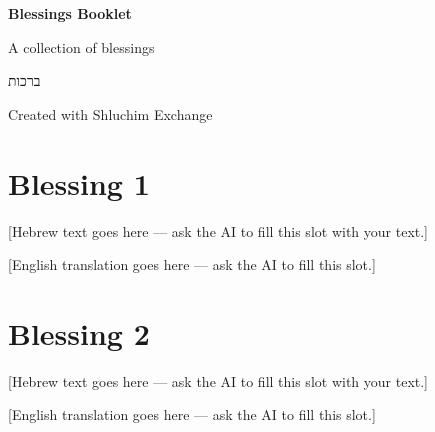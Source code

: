 \documentclass[11pt, openany]{book}
\newenvironment{hebrew}{%
  \par\begingroup\hebrewfont\TeXXeTstate=1\beginR\parindent=0pt\relax
}{%
  \endR\endgroup\par
}
\newcommand{\blessingslot}[3]{%
  \section*{#1}
  \begin{hebrew}#2\end{hebrew}
  \vspace{0.4em}
  {\color{muted}#3}
  \vspace{1.2em}
}
\begin{document}
\thispagestyle{empty}
\begin{center}
\vspace*{2.5cm}

{\color{accent}\Huge\bfseries Blessings Booklet}

\vspace{0.8cm}

{\large A collection of blessings}

\vspace{2cm}

{\hebrewfonttitle\color{accent} ברכות}

\vfill

{\small Created with Shluchim Exchange}
\end{center}
\clearpage

\blessingslot{Blessing 1}{%
[Hebrew text goes here — ask the AI to fill this slot with your text.]
}{%
[English translation goes here — ask the AI to fill this slot.]
}

\blessingslot{Blessing 2}{%
[Hebrew text goes here — ask the AI to fill this slot with your text.]
}{%
[English translation goes here — ask the AI to fill this slot.]
}
\end{document}

